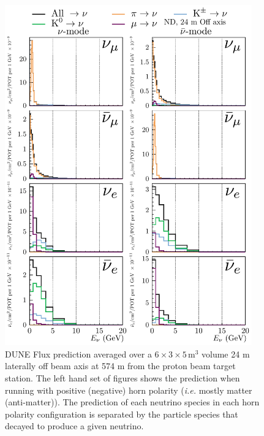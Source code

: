 \documentclass{article}
\begin{document}
\begin{figure}
  \centering
  \includegraphics[width=0.95\textwidth]{plots/fluxpredcompvar/ND_HadronParentFluxComponents_24m_offaxis}
  \caption{DUNE Flux prediction averaged over a $6\times 3\times 5\,\textrm{m}^{3}$ volume 24 m laterally off beam axis at 574 m from the proton beam target station. The left hand set of figures shows the prediction when running with positive (negative) horn polarity (\textit{i.e.} mostly matter (anti-matter)). The prediction of each neutrino species in each horn polarity configuration is separated by the particle species that decayed to produce a given neutrino.}
\end{figure}
\end{document}
